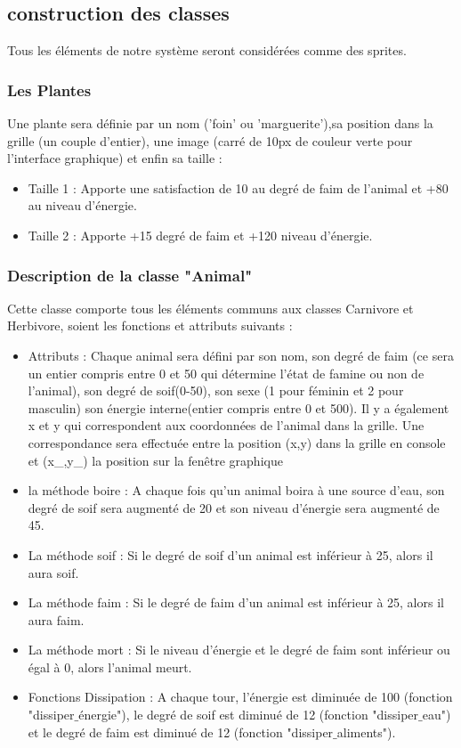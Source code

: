 \documentclass[a4paper,12pt]{article} %
\begin{document}
\subsection{construction des classes}
Tous les éléments de notre système seront considérées comme des sprites.
\subsubsection{Les Plantes}
Une plante sera définie par un nom ('foin' ou 'marguerite'),sa position dans la grille (un couple d'entier), une image (carré de 10px de couleur verte pour l'interface graphique) et enfin sa taille :
\begin{itemize}
\item Taille 1 : Apporte une satisfaction de  10 au degré de faim de l'animal et +80 au niveau d'énergie.
\item Taille 2 : Apporte +15 degré de faim et +120 niveau d'énergie.
\end{itemize}

\subsubsection{Description de la classe "Animal"}
Cette classe comporte tous les éléments communs aux classes Carnivore et Herbivore, soient les fonctions et attributs suivants :\\
\begin{itemize}
    \item Attributs : Chaque animal sera défini par son nom, son degré de faim (ce sera un entier compris entre 0 et 50 qui détermine l'état de famine ou non de l'animal), son degré de soif(0-50), son sexe (1 pour féminin et 2 pour masculin) son énergie interne(entier compris entre 0 et 500).
    Il y a également x et y qui correspondent aux coordonnées de l'animal dans la grille. Une correspondance sera effectuée entre la position (x,y) dans la grille en console et (x\_,y\_) la position sur la fenêtre graphique 
    
    \item la méthode boire : A chaque fois qu'un animal boira à une source d'eau, son degré de soif sera augmenté de 20 et son niveau d'énergie sera augmenté de 45. \\
    \item La méthode soif : Si le degré de soif d'un animal est inférieur à 25, alors il aura soif. 
    \item La méthode faim : Si le degré de faim d'un animal est inférieur à 25, alors il aura faim.
    \item La méthode mort : Si le niveau d'énergie et le degré de faim sont inférieur ou égal à 0, alors l'animal meurt.
    \item Fonctions Dissipation : A chaque tour, l'énergie est diminuée de 100 (fonction "dissiper$\_$énergie"), le degré de soif est diminué de 12 (fonction "dissiper$\_$eau") et le degré de faim est diminué de 12 (fonction "dissiper$\_$aliments").
\end{itemize}
\end{document}
